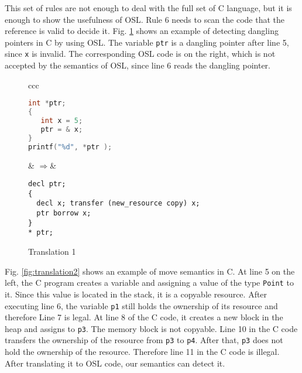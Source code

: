 \documentclass[runningheads]{llncs}
\def\codec#1{\texttt{#1}}
\begin{document}
This set of rules are not enough to deal with the full set of C language, but it is enough to show the usefulness of OSL.
Rule 6 needs to scan the code that the reference is valid to decide it.
Fig. \ref{fig:translation1} shows an example of detecting dangling pointers in C by using OSL.
The variable \codec{ptr} is a dangling pointer after line 5, since \codec{x} is invalid.
The corresponding OSL code is on the right, which is not accepted by the semantics of OSL, since
 line 6 reads the dangling pointer. 

\begin{figure}
		\vspace{-0.5cm}
\begin{center}
\begin{tabular}{ccc}
\begin{minipage}{0.25\textwidth}
\renewcommand{\ttdefault}{pcr}
\begin{lstlisting}[language=C]
int *ptr;
{
   int x = 5;
   ptr = & x;
}
printf("%d", *ptr );
\end{lstlisting}
\end{minipage}
 & \quad$\Rightarrow$\quad \quad\quad& 
 \begin{minipage}{0.5\textwidth}
 	\renewcommand{\ttdefault}{pcr}{\footnotesize
 	\begin{lstlisting}
decl ptr;
{
  decl x; transfer (new_resource copy) x;
  ptr borrow x;
}
* ptr;
 \end{lstlisting}}
 \end{minipage} 
\end{tabular}
\end{center}
\vspace{-0.5cm}
\caption{Translation 1}
\vspace{-0.5cm}
\label{fig:translation1}
\end{figure}

Fig. \ref{fig:translation2} shows an example of move semantics in C.
At line 5 on the left, the C program creates a variable and assigning
a value of the type \codec{Point} to it.
Since this value is located in the stack, it is a copyable resource.
After executing line 6, the variable \codec{p1} still holds the ownership of its resource and
therefore Line 7 is legal.
At line 8 of the C code, it creates a new block in the heap and assigns to \codec{p3}.
The memory block is not copyable.
Line 10 in the C code transfers the ownership of the resource from \codec{p3} to \codec{p4}.
After that, \codec{p3} does not hold the ownership of the resource.
Therefore line 11 in the C code is illegal.
After translating it to OSL code, our semantics can detect it.
\end{document}
